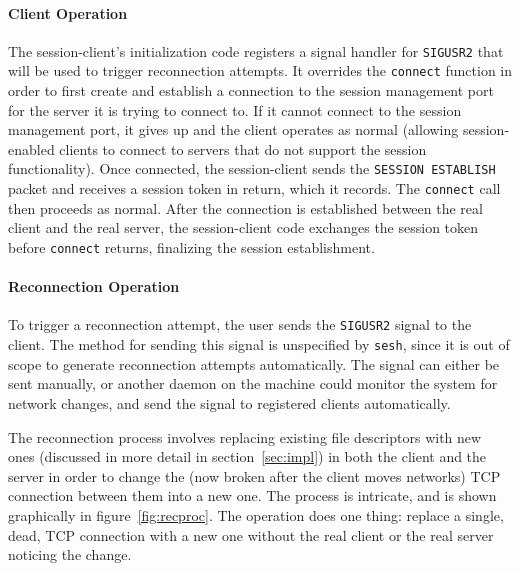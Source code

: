 \documentclass[twocolumn,11pt]{article}
\newcommand{\sesh}{\texttt{sesh}\xspace}
\begin{document}
\paragraph{Client Operation}
The session-client's initialization code registers a signal handler for
\texttt{SIGUSR2} that will be used to trigger reconnection attempts. It
overrides the \texttt{connect} function in order to first create and establish a
connection to the session management port for the server it is trying to connect
to. If it cannot connect to the session management port, it gives up and the
client operates as normal (allowing session-enabled clients to connect to
servers that do not support the session functionality). Once connected, the
session-client sends the \texttt{SESSION ESTABLISH} packet and receives a
session token in return, which it records. The \texttt{connect} call then proceeds as
normal. After the connection is established between the real client and the real
server, the session-client code exchanges the session token before
\texttt{connect} returns, finalizing the session establishment.


\paragraph{Reconnection Operation}
To trigger a reconnection attempt, the user sends the \texttt{SIGUSR2} signal to
the client. The method for sending this signal is unspecified by \sesh, since it
is out of scope to generate reconnection attempts automatically. The signal can
either be sent manually, or another daemon on the machine could monitor the
system for network changes, and send the signal to registered clients
automatically.

The reconnection process involves replacing existing file descriptors with new
ones (discussed in more detail in section~\ref{sec:impl}) in both the client and
the server in order to change the (now broken after the client moves networks)
TCP connection between them into a new one. The process is intricate, and is
shown graphically in figure~\ref{fig:recproc}. The operation does one thing:
replace a single, dead, TCP connection with a new one without the real client or
the real server noticing the change.
\end{document}
